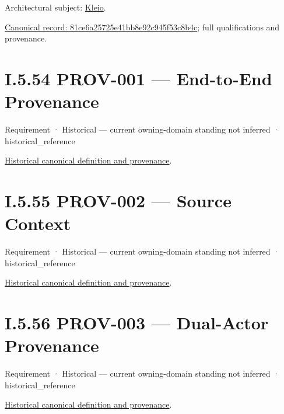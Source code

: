 Architectural subject: \hyperref[element:fefda110e2274884ad58906733606efd]{Kleio}.


{\footnotesize \href{../../../../continuum/motivation/requirement/81ce6a25725e41bb8e92c945f53c8b4c.md}{Canonical record: 81ce6a25725e41bb8e92c945f53c8b4c}; full qualifications and provenance.}\par
\section*{I.5.54 PROV-001 — End-to-End Provenance}
\label{navigation:I.5.54}

\label{element:3e45e60affb44bf384d54de26d3add6a}
{\small Requirement · Historical — current owning-domain standing not inferred · historical\_reference}\par
\href{../../../../continuum/motivation/requirement/3e45e60affb44bf384d54de26d3add6a.md}{Historical canonical definition and provenance}.\par
\section*{I.5.55 PROV-002 — Source Context}
\label{navigation:I.5.55}

\label{element:929ed42779a843dd84b683e3dcc35eb3}
{\small Requirement · Historical — current owning-domain standing not inferred · historical\_reference}\par
\href{../../../../continuum/motivation/requirement/929ed42779a843dd84b683e3dcc35eb3.md}{Historical canonical definition and provenance}.\par
\section*{I.5.56 PROV-003 — Dual-Actor Provenance}
\label{navigation:I.5.56}

\label{element:c016286faa3d4dfbbad133f73e855f1c}
{\small Requirement · Historical — current owning-domain standing not inferred · historical\_reference}\par
\href{../../../../continuum/motivation/requirement/c016286faa3d4dfbbad133f73e855f1c.md}{Historical canonical definition and provenance}.\par
